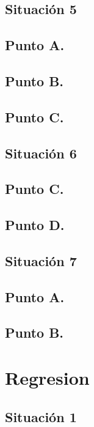\documentclass[letterpaper,12pt,onecolumn,titlepage]{article}
\begin{document}
\pagebreak\subsection{Situaci\'{o}n 5}
\subsection{Punto A.}
\subsection{Punto B.} 
\subsection{Punto C.}

\pagebreak\subsection{Situaci\'{o}n 6}
\subsection{Punto C.}
\subsection{Punto D.} 

\pagebreak\subsection{Situaci\'{o}n 7}
\subsection{Punto A.}
\subsection{Punto B.}

\pagebreak\section{Regresion}
\subsection{Situaci\'{o}n 1}
\end{document}
